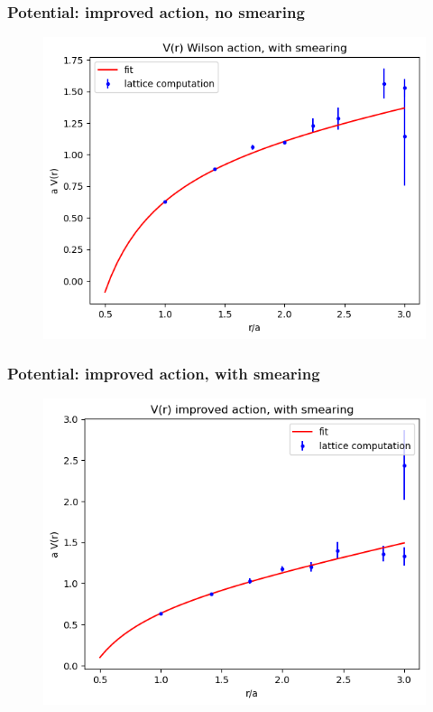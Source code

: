 \documentclass{beamer}
\begin{document}
\begin{frame}
\frametitle{Potential: improved action, no smearing}
\begin{figure}
    \centering
    \includegraphics[width=0.8\linewidth]{output3.png}
\end{figure}
\end{frame}

\begin{frame}
\frametitle{Potential: improved action, with smearing}
\begin{figure}
    \centering
    \includegraphics[width=0.8\linewidth]{output4.png}
\end{figure}
\end{frame}
\end{document}
